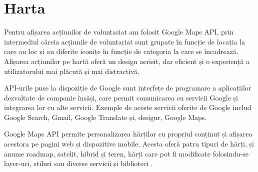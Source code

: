 \documentclass[12pt,a4paper]{report}
\begin{document}
\section{Harta}
\par
Pentru afișarea acțiunilor de voluntariat am folosit Google Maps API, prin intermediul căreia acțiunile de voluntariat sunt grupate în funcție de locația la care au loc și au diferite iconițe în funcție de categoria la care se încadrează. Afișarea acțiunilor pe hartă oferă un design aerisit, dar eficient și o experiență a utilizatorului mai plăcută și mai distractivă.
\\
\par
API-urile puse la dispoziție de Google sunt interfețe de programare a aplicațiilor dezvoltate de companie însăși, care permit comunicarea cu servicii Google și integrarea lor cu alte servicii. Exemple de aceste servicii oferite de Google includ Google Search, Gmail, Google Translate și, desigur, Google Maps.
\par
Google Maps API permite personalizarea hărților cu propriul conținut și afișarea acestora pe pagini web și dispozitive mobile. Acesta oferă patru tipuri de hărți, și anume roadmap, satelit, hibrid și teren, hărți care pot fi modificate folosindu-se layer-uri, stiluri sau diverse servicii și biblioteci \cite{gmaps}.

\newpage
\end{document}
